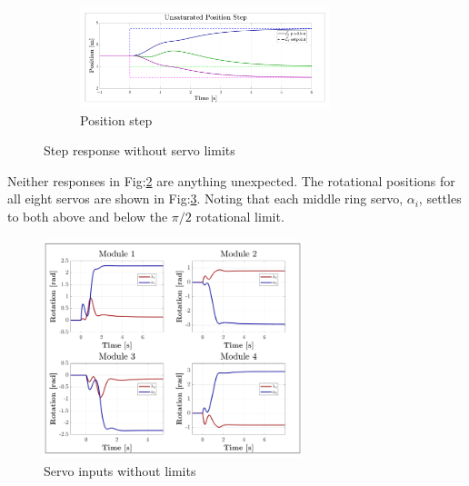 \newpage
\begin{figure}[htbp]
\vspace{-12pt}
\centering
\begin{subfigure}{\textwidth}
\centering
\includegraphics[width=0.8\textwidth]{graphs/unsaturated-position-step}
\vspace{-8pt}
\caption{Position step}
\label{fig:unsaturated-position-step}
\end{subfigure}
\vspace{-10pt}
\caption{Step response without servo limits}
\label{fig:unsaturated-step}
\vspace{-10pt}
\end{figure}
\par
Neither responses in Fig:\ref{fig:unsaturated-step} are anything unexpected. The rotational positions for all eight servos are shown in Fig:\ref{fig:unsaturated-servos}. Noting that each middle ring servo, $\alpha_i$, settles to both above and below the $\pi/2$ rotational limit.
\begin{figure}[hbtp]
\vspace{-12pt}
\centering
\includegraphics[width=0.67\textwidth]{graphs/unsaturated-servos}
\vspace{-12pt}
\caption{Servo inputs without limits}
\label{fig:unsaturated-servos}
\vspace{-20pt}
\end{figure}
